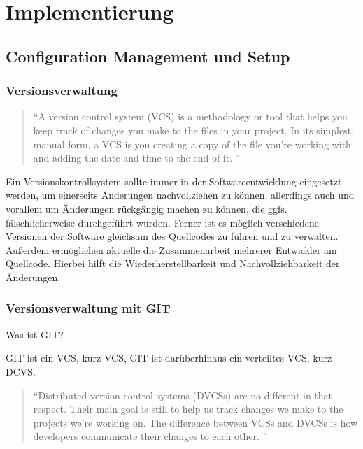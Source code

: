 \chapter{Implementierung} \label{kap:implementierung}

\section{Configuration Management und Setup}

\subsection{Versionsverwaltung}
\begin{quotation}
\enquote{A version control system (VCS) is a methodology or tool that helps you keep track of changes you make to the files in your project. In its simplest, manual form, a VCS is you creating a copy of the file you’re working with and adding the date and time to the end of it. \citep[S. 15][]{pragGit}}
\end{quotation}

Ein Versionskontrollsystem sollte immer in der Softwareentwicklung eingesetzt werden, um einerseits Änderungen nachvollziehen zu können, allerdings auch und vorallem um Änderungen rückgängig machen zu können, die ggfs. fälschlicherweise durchgeführt wurden. Ferner ist es möglich verschiedene Versionen der Software gleichsam des Quellcodes zu führen und zu verwalten. Außerdem ermöglichen aktuelle  die Zusammenarbeit mehrerer Entwickler am Quellcode. Hierbei hilft die Wiederherstellbarkeit und Nachvollziehbarkeit der Änderungen. 

\subsection{Versionsverwaltung mit GIT}

Was ist GIT?

GIT ist ein \gls{VCS}, kurz VCS, GIT ist darüberhinaus ein verteiltes \gls{VCS}, kurz DCVS.

\begin{quotation}
\enquote{Distributed version control systems (DVCSs) are no different in that respect. Their main goal is still to help us track changes we make to the projects we’re working on. The difference between VCSs and DVCSs is how developers communicate their changes to each other. \citep[S. 15][]{pragGit}}
\end{quotation}

